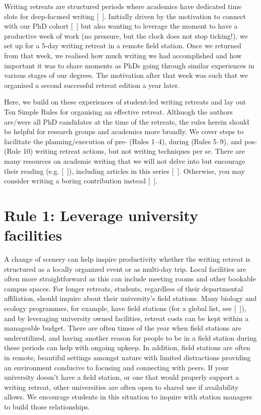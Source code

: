 \documentclass[10pt,letterpaper]{article}
\begin{document}
Writing retreats are structured periods where academics have dedicated time slots for deep-focused writing [~\cite{mcgrail2006, murray2009}]. Initially driven by the motivation to connect with our PhD cohort [~\cite{bernery, omeara}] but also wanting to leverage the moment to have a productive week of work (no pressure, but the clock does not stop ticking!), we set up for a 5-day writing retreat in a remote field station. Once we returned from that week, we realised how much writing we had accomplished and how important it was to share moments as PhDs going through similar experiences in various stages of our degrees. The motivation after that week was such that we organised a second successful retreat edition a year later.

Here, we build on these experiences of student-led writing retreats and lay out Ten Simple Rules for organising an effective retreat. Althuogh the authors are/were all PhD candidates at the time of the retreats, the rules herein should be helpful for research groups and academics more broadly. We cover steps to facilitate the planning/execution of pre- (Rules 1--4), during (Rules 5--9), and pos- (Rule 10) writing retreat actions, but not writing techniques per se. There are many resources on academic writing that we will not delve into but encourage their reading (e.g. [~\cite{turbek2016, hotaling2020, carter2020, cargill2021}]), including articles in this series [~\cite{weinberger2015, mensh2017, peterson2018}]. Otherwise, you may consider writing a boring contribution instead [~\cite{sand2007}].

\section*{Rule 1: Leverage university facilities}

A change of scenery can help inspire productivity whether the writing retreat is structured as a locally organized event or as multi-day trip. Local facilities are often more straightforward as this can include meeting rooms and other bookable campus spaces. For longer retreats, students, regardless of their departmental affiliation, should inquire about their university’s field stations. Many biology and ecology programmes, for example, have field stations (for a global list, see [~\cite{tydecks}]), and by leveraging university owned facilities, retreat costs can be kept within a manageable budget. There are often times of the year when field stations are underutilized, and having another reason for people to be in a field station during these periods can help with ongoing upkeep. In addition, field stations are often in remote, beautiful settings amongst nature with limited distractions providing an environment conducive to focusing and connecting with peers. If your university doesn’t have a field station, or one that would properly support a writing retreat, other universities are often open to shared use if availability allows. We encourage students in this situation to inquire with station managers to build those relationships.
\end{document}
